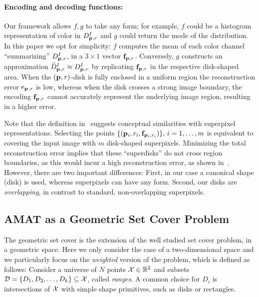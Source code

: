 \documentclass[10pt,twocolumn,letterpaper]{article}
\begin{document}
\paragraph{Encoding and decoding functions:}
Our framework allows $f,g$ to take any form; 
for example, $f$ could be a histogram representation of color in $D_{\mathbf{p}_{},r}^I$ and $g$ could return the mode of the distribution.
In this paper we opt for simplicity:
$f$ computes the mean of each color channel ``summarizing'' $D_{\mathbf{p}_{},r}^I$, in a $3\times1$ vector $\mathbf{f}_{\mathbf{p}_{},r}$.
Conversely, $g$ constructs an approximation $\tilde{D}_{\mathbf{p}_{},r}^I \approx D_{\mathbf{p}_{},r}^I$ by replicating $\mathbf{f}_{\mathbf{p}_{},r}$ in the
respective disk-shaped area.
When the $(\mathbf{p}_{},r)$-disk is fully enclosed in a uniform region the reconstruction error $e_{\mathbf{p}_{},r}$
is low, whereas when the disk crosses a strong image boundary, the encoding $\mathbf{f}_{\mathbf{p}_{},r}$ cannot accurately represent
the underlying image region, resulting in a higher error. 

Note that the definition in~ suggests conceptual similarities with superpixel representations.
Selecting the points $\{ (\mathbf{p}_{i},r_i,\mathbf{f}_{\mathbf{p}_{i},r_i}) \},\,i=1,\ldots,m$ is equivalent to covering the input image
with $m$ disk-shaped superpixels. Minimizing the total reconstruction error implies that these ``superdisks'' do not
cross region boundaries, as this would incur a high reconstruction error, as shown in~.
However, there are two important differences:
First, in our case a canonical shape (disk) is used, whereas superpixels can have any form. 
Second, our disks are \emph{overlapping}, in contrast to standard, non-overlapping superpixels.

\subsection{AMAT as a Geometric Set Cover Problem}\label{sec:method:wgsc}
The geometric set cover is the extension of the well studied set cover problem, in a geometric space.
Here we only consider the case of a two-dimensional space and we particularly focus on the 
\emph{weighted} version of the problem, which is defined as follows:
Consider a universe of $N$ points $\mathcal{X} \in \mathbb{R}^2$ and subsets
$\mathcal{D} = \{D_1,D_2,\ldots,D_k\} \subseteq \mathcal{X}$, called \emph{ranges}. 
A common choice for $D_i$ is intersections of $\mathcal{X}$ with simple shape primitives, such as disks or rectangles.
\end{document}
